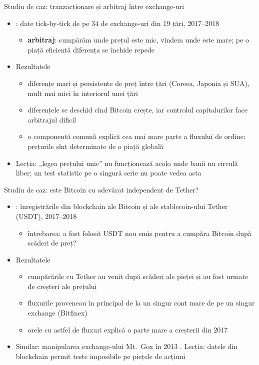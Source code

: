 \begin{frame}{Studiu de caz: tranzacționare și arbitraj între exchange-uri}
\itemsize{\small}
\begin{itemize}
    \item {}: date tick-by-tick de pe 34 de exchange-uri din 19 țări, 2017--2018
    \begin{itemize}
        \item \textbf{arbitraj}: cumpărăm unde prețul este mic, vindem unde este mare; pe o piață eficientă diferența se închide repede
    \end{itemize}
    \item Rezultatele
    \begin{itemize}
        \item diferențe mari și persistente de preț între țări (Coreea, Japonia și SUA), mult mai mici în interiorul unei țări
        \item diferențele se deschid cînd Bitcoin crește, iar controlul capitalurilor face arbitrajul dificil
        \item o componentă comună explică cea mai mare parte a fluxului de ordine: prețurile sînt determinate de o piață globală
    \end{itemize}
    \item Lecția: „legea prețului unic” nu funcționează acolo unde banii nu circulă liber; un test statistic pe o singură serie nu poate vedea asta
\end{itemize}
\end{frame}

\begin{frame}{Studiu de caz: este Bitcoin cu adevărat independent de Tether?}
\itemsize{\small}
\begin{itemize}
    \item {}: înregistrările din blockchain ale Bitcoin și ale stablecoin-ului Tether (USDT), 2017--2018
    \begin{itemize}
        \item întrebarea: a fost folosit USDT nou emis pentru a cumpăra Bitcoin după scăderi de preț?
    \end{itemize}
    \item Rezultatele
    \begin{itemize}
        \item cumpărările cu Tether au venit după scăderi ale pieței și au fost urmate de creșteri ale prețului
        \item fluxurile proveneau în principal de la un singur cont mare de pe un singur exchange (Bitfinex)
        \item orele cu astfel de fluxuri explică o parte mare a creșterii din 2017
    \end{itemize}
    \item Similar: manipularea exchange-ului Mt.~Gox în 2013 . Lecția: datele din blockchain permit teste imposibile pe piețele de acțiuni
\end{itemize}
\end{frame}


